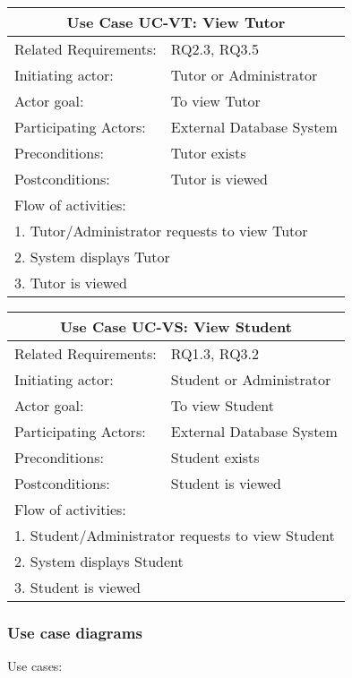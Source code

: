 \documentclass[12pt]{article}
\begin{document}
{		\begin{tabular}{| l | p{10cm}| }
			\hline\multicolumn{2}{|c|}{ \textbf{Use Case UC-VT: View Tutor}} \\ \hline
			Related Requirements: & RQ2.3, RQ3.5 \\ \hline
			Initiating actor: & Tutor or Administrator \\ \hline
			Actor goal: & To view Tutor\\ \hline
			Participating Actors: & External Database System\\ \hline
			Preconditions:& Tutor exists\\ \hline
			Postconditions: & Tutor is viewed\\ \hline
			\multicolumn{2}{|l|}{Flow of activities:}\\ \hline
			\multicolumn{2}{|p{15cm}|}{1. Tutor/Administrator requests to view Tutor}\\
			\multicolumn{2}{|p{15cm}|}{2. System displays Tutor}\\
			\multicolumn{2}{|l|}{3. Tutor is viewed}	
			\\ \hline		
		\end{tabular}	
		
		\begin{tabular}{| l | p{10cm}| }
			\hline\multicolumn{2}{|c|}{ \textbf{Use Case UC-VS: View Student}} \\ \hline
			Related Requirements: & RQ1.3, RQ3.2 \\ \hline
			Initiating actor: & Student or Administrator \\ \hline
			Actor goal: & To view Student\\ \hline
			Participating Actors: & External Database System\\ \hline
			Preconditions: &Student exists\\ \hline
			Postconditions: & Student is viewed\\ \hline
			\multicolumn{2}{|l|}{Flow of activities:}\\ \hline
			\multicolumn{2}{|p{15cm}|}{1. Student/Administrator requests to view Student}\\
			\multicolumn{2}{|p{15cm}|}{2. System displays Student}\\
			\multicolumn{2}{|l|}{3. Student is viewed}	
			\\ \hline		
		\end{tabular}	
		
		}
	\newpage	
\subsubsection{Use case diagrams}
\newpage
Use cases:
\end{document}
